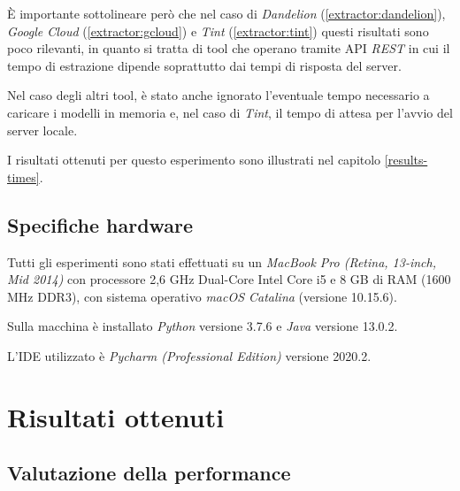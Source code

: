 \documentclass[a4paper,11pt]{article}
\begin{document}
È importante sottolineare però che nel caso di \textit{Dandelion} (\ref{extractor:dandelion}), \textit{Google Cloud} (\ref{extractor:gcloud}) e \textit{Tint} (\ref{extractor:tint}) questi risultati sono poco rilevanti, in quanto si tratta di tool che operano tramite API \textit{REST} in cui il tempo di estrazione dipende soprattutto dai tempi di risposta del server.

Nel caso degli altri tool, è stato anche ignorato l'eventuale tempo necessario a caricare i modelli in memoria e, nel caso di \textit{Tint}, il tempo di attesa per l'avvio del server locale.

I risultati ottenuti per questo esperimento sono illustrati nel capitolo \ref{results-times}.

\subsection{Specifiche hardware}
Tutti gli esperimenti sono stati effettuati su un \textit{MacBook Pro (Retina, 13-inch, Mid 2014)} con processore 2,6 GHz Dual-Core Intel Core i5 e 8 GB di RAM (1600 MHz DDR3), con sistema operativo \textit{macOS Catalina} (versione 10.15.6).

Sulla macchina è installato \textit{Python} versione 3.7.6 e \textit{Java} versione 13.0.2.

L'IDE utilizzato è \textit{Pycharm (Professional Edition)} versione 2020.2.

\clearpage
\section{Risultati ottenuti}
\label{sec:results}

\subsection{Valutazione della performance}
\label{results-performance}
\end{document}
